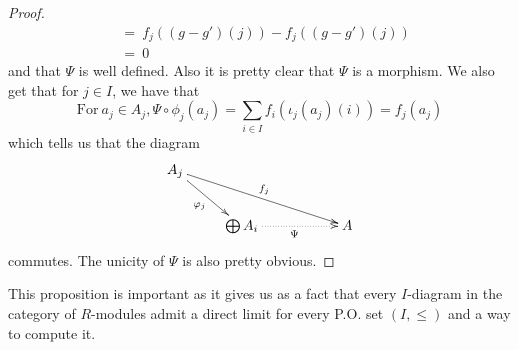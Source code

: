 \documentclass[11pt, a4paper, twoside]{article}
\begin{document}
\begin{proof}
\begin{align*}
    &=\ f_j((g-g')(j))-f_j((g-g')(j))\\ 
    &=\ 0
\end{align*}
and that $\Psi$ is well defined. Also it is pretty clear that $\Psi$ is a morphism. We also get that for $j\in I$, we have that 
\begin{displaymath}
    \mathrm{For}\ a_j\in A_j, \Psi\circ\phi_j(a_j)=\sum_{i\in I}f_i(\iota_j(a_j)(i))=f_j(a_j)
\end{displaymath}
which tells us that the diagram 
\begin{displaymath}
    \xymatrix{
     A_j\ar[dr]_{\phi_j}\ar[drrr]^{f_j}\\
    & \bigoplus A_i\ar@{.>}[rr]_{\Psi}  & & A
    }
\end{displaymath}
commutes. The unicity of $\Psi$  is also pretty obvious.
\end{proof}
\begin{remark}
This proposition is important as it gives us as a fact  that every $I$-diagram in the category of $R$-modules admit a direct limit for every P.O. set $(I,\leq)$ and a way to compute it.
\end{remark}
\end{document}
